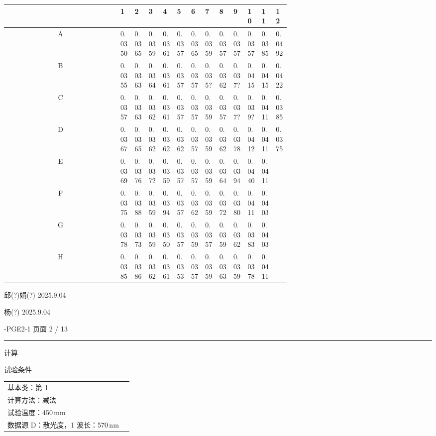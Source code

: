 \documentclass[UTF8,10pt,a4paper,fontset=fandol]{ctexart}
\newcommand{\handwritten}[1]{#1}
\begin{document}
\begin{center}
\scriptsize
\setlength{\tabcolsep}{2pt}
\begin{tabular}{c|*{12}{p{0.055\linewidth}|}}
 & 1 & 2 & 3 & 4 & 5 & 6 & 7 & 8 & 9 & 10 & 11 & 12\\ \hline
A & 0.0350 & 0.0365 & 0.0359 & 0.0361 & 0.0357 & 0.0365 & 0.0359 & 0.0357 & 0.0357 & 0.0357 & 0.0385 & 0.0492\\ \hline
B & 0.0355 & 0.0363 & 0.0364 & 0.0361 & 0.0357 & 0.0357 & 0.035? & 0.0362 & 0.037? & 0.0415 & 0.0415 & 0.0422\\ \hline
C & 0.0357 & 0.0363 & 0.0362 & 0.0361 & 0.0357 & 0.0357 & 0.0359 & 0.0357 & 0.037? & 0.039? & 0.0411 & 0.0385\\ \hline
D & 0.0367 & 0.0365 & 0.0362 & 0.0362 & 0.0362 & 0.0357 & 0.0359 & 0.0362 & 0.0378 & 0.0412 & 0.0411 & 0.0375\\ \hline
E & 0.0369 & 0.0376 & 0.0372 & 0.0359 & 0.0357 & 0.0357 & 0.0359 & 0.0364 & 0.0394 & 0.0440 & 0.0411 & \\ \hline
F & 0.0375 & 0.0388 & 0.0359 & 0.0394 & 0.0357 & 0.0362 & 0.0359 & 0.0372 & 0.0380 & 0.0411 & 0.0403 & \\ \hline
G & 0.0378 & 0.0373 & 0.0359 & 0.0350 & 0.0357 & 0.0359 & 0.0357 & 0.0359 & 0.0362 & 0.0383 & 0.0403 & \\ \hline
H & 0.0385 & 0.0386 & 0.0362 & 0.0361 & 0.0353 & 0.0357 & 0.0359 & 0.0363 & 0.0359 & 0.0378 & 0.0411 & \\
\end{tabular}
\end{center}


\handwritten{邱(?)娟(?) 2025.9.04}

\handwritten{杨(?) 2025.9.04}

\newpage

-PGE2-1 \hfill 页面 2 / 13

\noindent\rule{\linewidth}{0.4pt}

\noindent
计算

\noindent
试验条件

\noindent
\begin{tabular}{@{}ll@{}}
基本类：第 1 & \\
计算方法：减法 & \\
试验温度：450\,mm & \\
数据源 D：散光度，1 波长：570\,nm &
\end{tabular}
\end{document}
